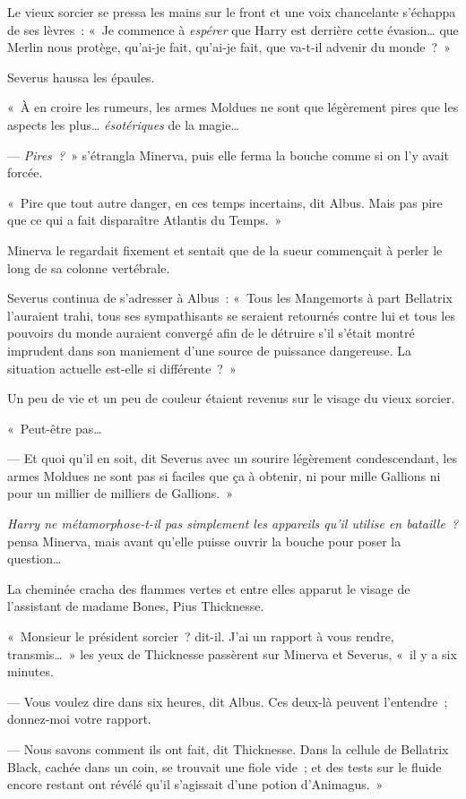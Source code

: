 Le vieux sorcier se pressa les mains sur le front et une voix chancelante s'échappa de ses lèvres~: «~Je commence à \emph{espérer} que Harry est derrière cette évasion… que Merlin nous protège, qu'ai-je fait, qu'ai-je fait, que va-t-il advenir du monde~?~»

Severus haussa les épaules.

«~À en croire les rumeurs, les armes Moldues ne sont que légèrement pires que les aspects les plus… \emph{ésotériques} de la magie…

--- \emph{Pires~?}~» s'étrangla Minerva, puis elle ferma la bouche comme si on l'y avait forcée.

«~Pire que tout autre danger, en ces temps incertains, dit Albus. Mais pas pire que ce qui a fait disparaître Atlantis du Temps.~»

Minerva le regardait fixement et sentait que de la sueur commençait à perler le long de sa colonne vertébrale.

Severus continua de s'adresser à Albus~: «~Tous les Mangemorts à part Bellatrix l'auraient trahi, tous ses sympathisants se seraient retournés contre lui et tous les pouvoirs du monde auraient convergé afin de le détruire s'il s'était montré imprudent dans son maniement d'une source de puissance dangereuse. La situation actuelle est-elle si différente~?~»

Un peu de vie et un peu de couleur étaient revenus sur le visage du vieux sorcier.

«~Peut-être pas…

--- Et quoi qu'il en soit, dit Severus avec un sourire légèrement condescendant, les armes Moldues ne sont pas si faciles que ça à obtenir, ni pour mille Gallions ni pour un millier de milliers de Gallions.~»

\emph{Harry ne métamorphose-t-il pas simplement les appareils qu'il utilise en bataille~?} pensa Minerva, mais avant qu'elle puisse ouvrir la bouche pour poser la question…

La cheminée cracha des flammes vertes et entre elles apparut le visage de l'assistant de madame Bones, Pius Thicknesse.

«~Monsieur le président sorcier~? dit-il. J'ai un rapport à vous rendre, transmis…~» les yeux de Thicknesse passèrent sur Minerva et Severus, «~il y a six minutes.

--- Vous voulez dire dans six heures, dit Albus. Ces deux-là peuvent l'entendre~; donnez-moi votre rapport.

--- Nous savons comment ils ont fait, dit Thicknesse. Dans la cellule de Bellatrix Black, cachée dans un coin, se trouvait une fiole vide~; et des tests sur le fluide encore restant ont révélé qu'il s'agissait d'une potion d'Animagus.~»

